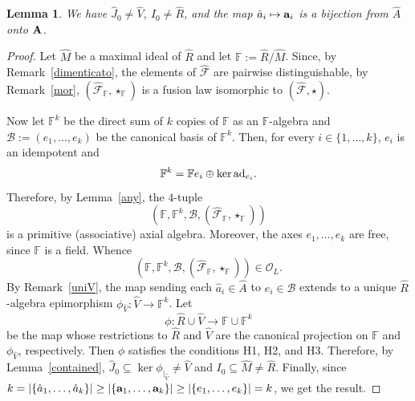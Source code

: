 \documentclass[a4paper]{amsart}
\newtheorem{lemma}{Lemma}[section]
\newcommand{\Amo}{{\mathcal {\bf A}}}
\newcommand{\A}{ {\hat A}}
\newcommand{\ad}{{\rm ad}}
\newcommand{\aV}{{\hat V}}
\newcommand{\aR}{{\hat R}}
\newcommand{\F}{{\mathbb F}}
\newcommand{\hJ}{{\hat J}}
\newcommand{\ha}{{\hat a}}
\newcommand{\ba}{{\bf a}}
\begin{document}
\begin{lemma} \label{example}
We have $\hJ_0\neq \aV$, $I_0\neq \hat R$, and the map $\ha_i\mapsto \ba_i$ is a bijection from $\A$ onto $\Amo $. 
\end{lemma}
\begin{proof}
Let $\hat M$ be a maximal ideal of $\aR$ and  let $\F:=\aR/\hat M$. 
Since, by Remark~\ref{dimenticato}, the elements of $\hat{\mathcal F}$ are pairwise distinguishable, by Remark~\ref{mor}, $(\hat{\mathcal F}_\F, \star_{\F} )$ is a fusion law isomorphic to $(\hat{\mathcal F}, \star )$. 

Now let $\F^k$ be the direct sum of $k$ copies of $\F$ as an $\F$-algebra and $\mathcal B:=(e_1,\ldots ,e_k)$ be the canonical basis of $\F^k$. Then, for every $i\in \{1, \ldots , k\}$, $e_i$ is an idempotent and 
$$
\F^k=\F e_i\oplus \ker \ad_{e_i}.
$$
Therefore, by Lemma~\ref{any}, the $4$-tuple $$( \F, \F^k, \mathcal B, (\hat{\mathcal F}_\F, \star_{\F} ))$$ is a primitive (associative) axial algebra. Moreover, the axes $e_1, \ldots , e_k$ are free, since $\F$ is a field. Whence 
$$
( \F, \F^k, \mathcal B, (\hat{\mathcal F}_\F, \star_{\F} ))\in \mathcal O_L.
$$
By Remark~\ref{uniV},  the map sending each $\ha_i\in \A$ to $e_i\in \mathcal B$  extends to a unique $\hat R$-algebra epimorphism $\phi_{\aV}\colon \aV \to \F^k$.  Let 
$$
\phi\colon \aR \cup \aV \to \F \cup \F^k
$$ 
be the map whose restrictions to $\aR$ and $\aV$ are the canonical projection on $\F$ and $\phi_{\aV}$, respectively. Then $\phi$   satisfies the conditions H1, H2, and H3. Therefore, by Lemma~\ref{contained}, $\hJ_0\subseteq \ker \phi_{|_{\aV}}\neq \aV$ and $I_0\subseteq \hat M\neq \hat R$. Finally, since $k=|\{\ha_1, \ldots , \ha_k\}|\geq |\{\ba_1, \ldots , \ba_k\}|\geq |\{e_1, \ldots , e_k\}|=k$, we get the result.
\end{proof}
\medskip
\end{document}

